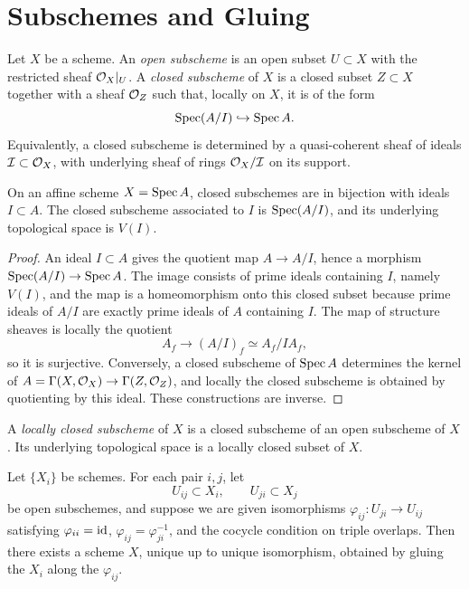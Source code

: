 \section{Subschemes and Gluing}

\begin{definition}
Let \(X\) be a scheme.  An \emph{open subscheme} is an open subset
\(U\subset X\) with the restricted sheaf \(\mathcal{O}_X|_U\).  A \emph{closed
subscheme} of \(X\) is a closed subset \(Z\subset X\) together with a sheaf
\(\mathcal{O}_Z\) such that, locally on \(X\), it is of the form
\[
    \operatorname{Spec}(A/I)\hookrightarrow \operatorname{Spec} A.
\]
Equivalently, a closed subscheme is determined by a quasi-coherent sheaf of
ideals \(\mathcal{I}\subset\mathcal{O}_X\), with underlying sheaf of rings
\(\mathcal{O}_X/\mathcal{I}\) on its support.
\end{definition}

\begin{proposition}
On an affine scheme \(X=\operatorname{Spec} A\), closed subschemes are in bijection with
ideals \(I\subset A\).  The closed subscheme associated to \(I\) is
\(\operatorname{Spec}(A/I)\), and its underlying topological space is \(V(I)\).
\end{proposition}

\begin{proof}
An ideal \(I\subset A\) gives the quotient map \(A\to A/I\), hence a morphism
\(\operatorname{Spec}(A/I)\to\operatorname{Spec} A\).  The image consists of prime ideals containing \(I\),
namely \(V(I)\), and the map is a homeomorphism onto this closed subset because
prime ideals of \(A/I\) are exactly prime ideals of \(A\) containing \(I\).
The map of structure sheaves is locally the quotient
\[
    A_f\longrightarrow (A/I)_f\simeq A_f/IA_f,
\]
so it is surjective.  Conversely, a closed subscheme of \(\operatorname{Spec} A\) determines
the kernel of \(A=\Gamma(X,\mathcal{O}_X)\to\Gamma(Z,\mathcal{O}_Z)\), and locally the closed
subscheme is obtained by quotienting by this ideal.  These constructions are
inverse.
\end{proof}

\begin{definition}
A \emph{locally closed subscheme} of \(X\) is a closed subscheme of an open
subscheme of \(X\).  Its underlying topological space is a locally closed
subset of \(X\).
\end{definition}

\begin{proposition}
Let \(\{X_i\}\) be schemes.  For each pair \(i,j\), let
\[
    U_{ij}\subset X_i,\qquad U_{ji}\subset X_j
\]
be open subschemes, and suppose we are given isomorphisms
\(\varphi_{ij}:U_{ji}\to U_{ij}\) satisfying
\(\varphi_{ii}=\operatorname{id}\), \(\varphi_{ij}=\varphi_{ji}^{-1}\), and the cocycle
condition on triple overlaps.  Then there exists a scheme \(X\), unique up to
unique isomorphism, obtained by gluing the \(X_i\) along the \(\varphi_{ij}\).
\end{proposition}

